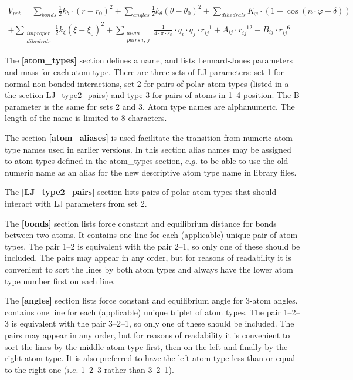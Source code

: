 \documentclass[a4paper,11pt]{article}
\begin{document}
\begin {equation}
\begin{split}
\label{eq:V_pot2}
 V_{pot} =\sum\limits_{bonds} {\frac{1}{2}k_b \cdot \left( {r-r_0
} \right)^2} +\sum\limits_{angles} {\frac{1}{2}k_\theta \left(
{\theta -\theta_0} \right)^2} +\sum\limits_{dihedrals} {K_\varphi
\cdot \left( {1+\cos \left( {n\cdot \varphi -\delta } \right)}
\right)} \nonumber \\
  +\sum\limits_{\substack{improper \\ dihedrals}}
{\frac{1}{2}k_\xi \left( {\xi -\xi _0} \right)^2}
+\sum\limits_{\substack{atom \\ pairs \; i , \, j}}
{\frac{1}{4\cdot \pi \cdot \varepsilon_0 } \cdot q_i \cdot q_j
\cdot r_{ij}^{-1} +A_{ij} \cdot r_{ij}^{-12} -B_{ij} \cdot
r_{ij}^{-6} }
\end{split}
\end{equation}

The  \textbf{[atom{\_}types]}  section  defines   a  name,  and  lists
Lennard-Jones parameters and mass for  each atom type. There are three
sets of LJ parameters: set 1 for normal non-bonded interactions, set 2
for   pairs  of   polar  atom   types   (listed  in   a  the   section
LJ{\_}type2{\_}pairs)  and  type   3  for  pairs  of   atoms  in  1--4
position. The  B parameter  is the same  for sets 2  and 3.  Atom type
names  are alphanumeric.  The  length  of the  name  is  limited to  8
characters.

The   section  \textbf{[atom{\_}aliases]}   is  used   facilitate  the
transition from numeric atom type  names used in earlier versions.  In
this section alias names may be  assigned to atom types defined in the
atom{\_}types section, $e.g.$  to be able to use the  old numeric name
as an alias for the new descriptive atom type name in library files.

The \textbf{[LJ{\_}type2{\_}pairs]} section lists  pairs of polar atom
types that should interact with LJ parameters from set 2.

The  \textbf{[bonds]} section  lists  force  constant and  equilibrium
distance for  bonds between two atoms.  It contains one line  for each
(applicable) unique  pair of atom  types. The pair 1--2  is equivalent
with the pair 2--1, so only one of these should be included. The pairs
may  appear  in any  order,  but  for  reasons  of readability  it  is
convenient to  sort the lines by  both atom types and  always have the
lower atom type number first on each line.

The  \textbf{[angles]} section  lists force  constant and  equilibrium
angle  for 3-atom  angles.  contains one  line  for each  (applicable)
unique triplet of atom types. The  pair 1--2--3 is equivalent with the
pair 3--2--1, so  only one of these should be  included. The pairs may
appear in any  order, but for reasons of readability  it is convenient
to sort the lines by the middle  atom type first, then on the left and
finally by the right atom type. It  is also preferred to have the left
atom type less  than or equal to the right  one ($i.e.$ 1--2--3 rather
than 3--2--1).
\end{document}
